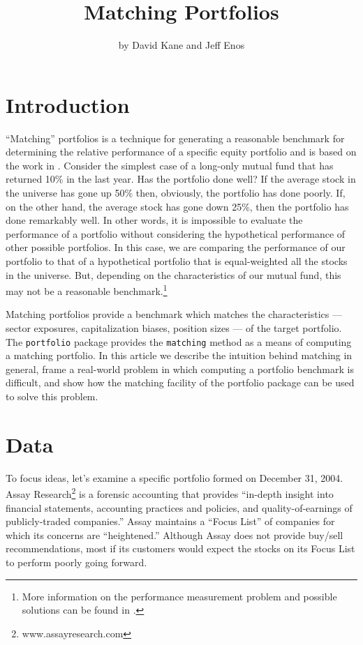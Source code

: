 \documentclass{article}
\begin{document}
\title{Matching Portfolios}
\author{by David Kane and Jeff Enos}


\maketitle

\section{Introduction}

``Matching'' portfolios is a technique for generating a reasonable
benchmark for determining the relative performance of a specific
equity portfolio and is based on the work in \citet{matchit.paper}.
Consider the simplest case of a long-only mutual fund that has
returned 10\% in the last year. Has the portfolio done well? If the
average stock in the universe has gone up 50\% then, obviously, the
portfolio has done poorly. If, on the other hand, the average stock
has gone down 25\%, then the portfolio has done remarkably well.  In
other words, it is impossible to evaluate the performance of a
portfolio without considering the hypothetical performance of other
possible portfolios. In this case, we are comparing the performance of
our portfolio to that of a hypothetical portfolio that is
equal-weighted all the stocks in the universe. But, depending on the
characteristics of our mutual fund, this may not be a reasonable
benchmark.\footnote{More information on the performance measurement problem
and possible solutions can be found in \citet{burns2004}.}

Matching portfolios provide a benchmark which matches the
characteristics --- sector exposures, capitalization biases, position
sizes --- of the target portfolio.  The \texttt{portfolio} package
provides the \texttt{matching} method as a means of computing a
matching portfolio.  In this article we describe the intuition behind
matching in general, frame a real-world problem in which computing a
portfolio benchmark is difficult, and show how the matching facility
of the portfolio package can be used to solve this problem.

\section{Data}



To focus ideas, let's examine a specific portfolio formed on December
31, 2004. Assay Research\footnote{www.assayresearch.com} is a
forensic accounting that provides ``in-depth insight into financial
statements, accounting practices and policies, and quality-of-earnings
of publicly-traded companies.'' Assay maintains a ``Focus List'' of
companies for which its concerns are ``heightened.'' Although Assay
does not provide buy/sell recommendations, most if its customers would
expect the stocks on its Focus List to perform poorly going forward.
\end{document}
